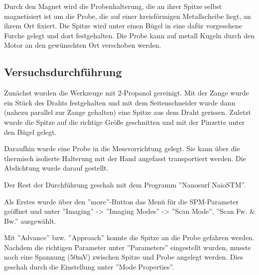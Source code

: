 \noindent Durch den Magnet wird die Probenhalterung, die an ihrer Spitze selbst magnetisiert ist um die Probe, die auf einer kreisförmigen Metallscheibe liegt, an ihrem Ort fixiert. Die Spitze wird unter einen Bügel in eine dafür vorgesehene Furche gelegt und dort festgehalten. Die Probe kann auf metall Kugeln durch den Motor an den gewünschten Ort verschoben werden.

\subsection{Versuchsdurchführung}
Zunächst wurden die Werkzeuge mit 2-Propanol gereinigt. Mit der Zange wurde ein Stück des Drahts festgehalten und mit dem Seitenschneider wurde dann (nahezu parallel zur Zange gehalten) eine Spitze aus dem Draht gerissen. Zuletzt wurde die Spitze auf die richtige Größe geschnitten und mit der Pinzette unter den Bügel gelegt.

\noindent Daraufhin wurde eine Probe in die Messvorrichtung gelegt. Sie kann über die thermisch isolierte Halterung mit der Hand angefasst transportiert werden. Die Abdichtung wurde darauf gestellt.

\noindent Der Rest der Durchführung geschah mit dem Programm ''Nanosurf NaioSTM''.

\noindent Als Erstes wurde über den ''more''-Button das Menü für die SPM-Parameter geöffnet und unter ''Imaging'' -> ''Imaging Modes'' -> ''Scan Mode'', ''Scan Fw. \& Bw.'' ausgewählt.

\noindent Mit ''Advance'' bzw. ''Approach'' konnte die Spitze an die Probe gefahren werden. Nachdem die richtigen Parameter unter ''Parameters'' eingestellt wurden, musste noch eine Spannung (\(50\)mV) zwischen Spitze und Probe angelegt werden. Dies geschah durch die Einstellung unter ''Mode Properties''.